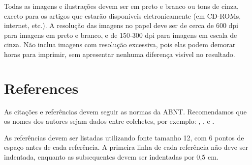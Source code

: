 \documentclass[12pt]{article}
\begin{document}
Todas as imagens e ilustrações devem ser em preto e branco ou tons de cinza, exceto para os artigos que estarão disponíveis eletronicamente (em CD-ROMs, internet, etc.). A resolução das imagens no papel deve ser de cerca de 600 dpi para imagens em preto e branco, e de 150-300 dpi para imagens em escala de cinza. Não inclua imagens com resolução excessiva, pois elas podem demorar horas para imprimir, sem apresentar nenhuma diferença visível no resultado.



\section{References}

As citações e referências devem seguir as normas da ABNT. Recomendamos que os nomes dos autores sejam dados entre colchetes, por exemplo: \cite{kolevaPropertiesMixedReality1999}, \cite{toriIntroducaoRealidadeVirtual2020}, \cite{laarniWaysMeasurePresence2015} e \cite{jeraldVRBookHumanCentered2015}.

As referências devem ser listadas utilizando fonte tamanho 12, com 6 pontos de espaço antes de cada referência. A primeira linha de cada referência não deve ser indentada, enquanto as subsequentes devem ser indentadas por 0,5 cm.



\end{document}
